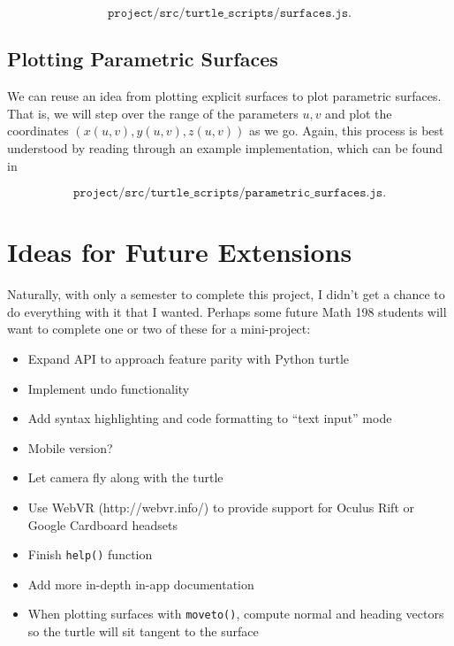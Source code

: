 \documentclass[12pt]{article}
\begin{document}
\[\texttt{project/src/turtle\_scripts/surfaces.js}.\] 

\subsection{Plotting Parametric Surfaces}

We can reuse an idea from plotting explicit surfaces to plot parametric surfaces. That is, we will step over the range of the parameters $u, v$ and plot the coordinates $(x(u, v), y(u, v), z(u, v))$ as we go. Again, this process is best understood by reading through an example implementation, which can be found in

\[\texttt{project/src/turtle\_scripts/parametric\_surfaces.js}.\]

\section{Ideas for Future Extensions}

Naturally, with only a semester to complete this project, I didn't get a chance to do everything with it that I wanted. Perhaps some future Math 198 students will want to complete one or two of these for a mini-project:
\begin{itemize}
\item Expand API to approach feature parity with Python turtle
\item Implement undo functionality
\item Add syntax highlighting and code formatting to ``text input” mode
\item Mobile version?
\item Let camera fly along with the turtle
\item Use WebVR (http://webvr.info/) to provide support for Oculus Rift or Google Cardboard headsets
\item Finish \texttt{help()} function
\item Add more in-depth in-app documentation
\item When plotting surfaces with \texttt{moveto()}, compute normal and heading vectors so the turtle will sit tangent to the surface
\end{itemize}
\end{document}
